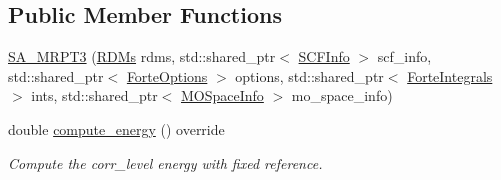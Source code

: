 \subsection*{Public Member Functions}
\begin{DoxyCompactItemize}
\item 
\mbox{\hyperlink{classforte_1_1_s_a___m_r_p_t3_afa9838afcd96bc6d27ce930d582ad9cc}{S\+A\+\_\+\+M\+R\+P\+T3}} (\mbox{\hyperlink{classforte_1_1_r_d_ms}{R\+D\+Ms}} rdms, std\+::shared\+\_\+ptr$<$ \mbox{\hyperlink{classforte_1_1_s_c_f_info}{S\+C\+F\+Info}} $>$ scf\+\_\+info, std\+::shared\+\_\+ptr$<$ \mbox{\hyperlink{classforte_1_1_forte_options}{Forte\+Options}} $>$ options, std\+::shared\+\_\+ptr$<$ \mbox{\hyperlink{classforte_1_1_forte_integrals}{Forte\+Integrals}} $>$ ints, std\+::shared\+\_\+ptr$<$ \mbox{\hyperlink{classforte_1_1_m_o_space_info}{M\+O\+Space\+Info}} $>$ mo\+\_\+space\+\_\+info)
\item 
double \mbox{\hyperlink{classforte_1_1_s_a___m_r_p_t3_a566a1aa6f6d3cbb8acdac40cba928aaf}{compute\+\_\+energy}} () override
\begin{DoxyCompactList}\small\item\em Compute the corr\+\_\+level energy with fixed reference. \end{DoxyCompactList}\end{DoxyCompactItemize}
